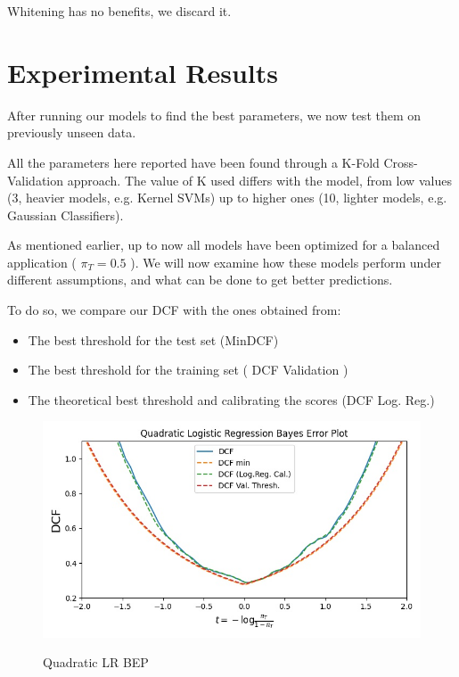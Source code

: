 \documentclass[hidelinks, 12pt, twocolumn]{article}
\begin{document}
Whitening has no benefits, we discard it.

\section{Experimental Results}

After running our models to find the best parameters, we now test them on previously unseen data.

All the parameters here reported have been found through a K-Fold Cross-Validation approach.
The value of K used differs with the model, from low values (3, heavier models, e.g. Kernel SVMs) 
up to higher ones (10, lighter models, e.g. Gaussian Classifiers).

As mentioned earlier, up to now all models have been optimized for a balanced application ( $\pi_T = 0.5$ ).
We will now examine how these models perform under different assumptions,
and what can be done to get better predictions.

To do so, we compare our DCF with the ones obtained from:

\begin{itemize}
    \item The best threshold for the test set (MinDCF)
    \item The best threshold for the training set ( DCF Validation )
    \item The theoretical best threshold and calibrating the scores (DCF Log. Reg.)
\end{itemize}

\begin{figure}[H] 
    {\includegraphics[width=\linewidth]{logregquadBEP.jpg}}
    \caption{Quadratic LR BEP}
    \label{fig:quadlogregbep}
\end{figure}
\end{document}
